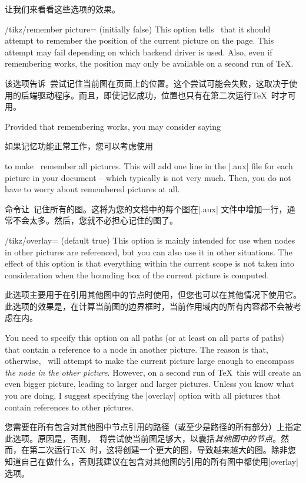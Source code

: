 让我们来看看这些选项的效果。
%
\begin{key}{/tikz/remember picture= (initially false)}
    This option tells \tikzname\ that it should attempt to remember the
    position of the current picture on the page. This attempt may fail
    depending on which backend driver is used. Also, even if remembering works,
    the position may only be available on a second run of \TeX.

    该选项告诉\tikzname\ 尝试记住当前图在页面上的位置。这个尝试可能会失败，这取决于使用的后端驱动程序。而且，即使记忆成功，位置也只有在第二次运行\TeX\ 时才可用。



    Provided that remembering works, you may consider saying

    如果记忆功能正常工作，您可以考虑使用




\begin{codeexample}
\end{codeexample}
    to make \tikzname\ remember all pictures. This will add one line in the
    |.aux| file for each picture in your document -- which typically is not
    very much. Then, you do not have to worry about remembered pictures at all.

    命令让\tikzname\ 记住所有的图。这将为您的文档中的每个图在|.aux| 文件中增加一行，通常不会太多。然后，您就不必担心记住的图了。
\end{key}

\begin{key}{/tikz/overlay= (default true)}
    This option is mainly intended for use when nodes in other pictures are
    referenced, but you can also use it in other situations. The effect of this
    option is that everything within the current scope is not taken into
    consideration when the bounding box of the current picture is computed.

    此选项主要用于在引用其他图中的节点时使用，但您也可以在其他情况下使用它。此选项的效果是，在计算当前图的边界框时，当前作用域内的所有内容都不会被考虑在内。



    You need to specify this option on all paths (or at least on all parts of
    paths) that contain a reference to a node in another picture. The reason is
    that, otherwise, \tikzname\ will attempt to make the current picture large
    enough to encompass \emph{the node in the other picture}. However, on a
    second run of \TeX\ this will create an even bigger picture, leading to
    larger and larger pictures. Unless you know what you are doing, I suggest
    specifying the |overlay| option with all pictures that contain references
    to other pictures.

    您需要在所有包含对其他图中节点引用的路径（或至少是路径的所有部分）上指定此选项。原因是，否则，\tikzname\ 将尝试使当前图足够大，以囊括\emph{其他图中的节点}。然而，在第二次运行\TeX\ 时，这将创建一个更大的图，导致越来越大的图。除非您知道自己在做什么，否则我建议在包含对其他图的引用的所有图中都使用|overlay| 选项。


\end{key}

